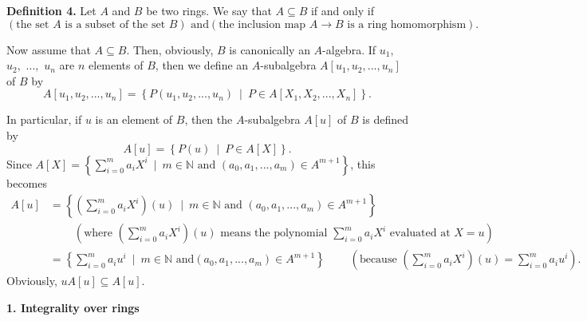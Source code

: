 \documentclass[12pt,final,notitlepage,onecolumn]{article}%
\begin{document}
\textbf{Definition 4.} Let $A$ and $B$ be two rings. We say that $A\subseteq
B$ if and only if
\[
\left(  \text{the set }A\text{ is a subset of the set }B\right)  \text{ and
}\left(  \text{the inclusion map }A\rightarrow B\text{ is a ring
homomorphism}\right)  .
\]


Now assume that $A\subseteq B$. Then, obviously, $B$ is canonically an
$A$-algebra. If $u_{1},$ $u_{2},$ $...,$ $u_{n}$ are $n$ elements of $B$, then
we define an $A$-subalgebra $A\left[  u_{1},u_{2},...,u_{n}\right]  $ of $B$
by%
\[
A\left[  u_{1},u_{2},...,u_{n}\right]  =\left\{  P\left(  u_{1},u_{2}%
,...,u_{n}\right)  \ \mid\ P\in A\left[  X_{1},X_{2},...,X_{n}\right]
\right\}  .
\]


In particular, if $u$ is an element of $B$, then the $A$-subalgebra $A\left[
u\right]  $ of $B$ is defined by%
\[
A\left[  u\right]  =\left\{  P\left(  u\right)  \ \mid\ P\in A\left[
X\right]  \right\}  .
\]
Since $A\left[  X\right]  =\left\{  \sum\limits_{i=0}^{m}a_{i}X^{i}%
\ \mid\ m\in\mathbb{N}\text{ and }\left(  a_{0},a_{1},...,a_{m}\right)  \in
A^{m+1}\right\}  $, this becomes
\begin{align*}
A\left[  u\right]   &  =\left\{  \left(  \sum\limits_{i=0}^{m}a_{i}%
X^{i}\right)  \left(  u\right)  \ \mid\ m\in\mathbb{N}\text{ and }\left(
a_{0},a_{1},...,a_{m}\right)  \in A^{m+1}\right\} \\
&  \ \ \ \ \ \ \ \ \ \ \left(  \text{where }\left(  \sum\limits_{i=0}^{m}%
a_{i}X^{i}\right)  \left(  u\right)  \text{ means the polynomial }%
\sum\limits_{i=0}^{m}a_{i}X^{i}\text{ evaluated at }X=u\right) \\
&  =\left\{  \sum\limits_{i=0}^{m}a_{i}u^{i}\ \mid\ m\in\mathbb{N}\text{ and
}\left(  a_{0},a_{1},...,a_{m}\right)  \in A^{m+1}\right\}
\ \ \ \ \ \ \ \ \ \ \left(  \text{because }\left(  \sum\limits_{i=0}^{m}%
a_{i}X^{i}\right)  \left(  u\right)  =\sum\limits_{i=0}^{m}a_{i}u^{i}\right)
.
\end{align*}
Obviously, $uA\left[  u\right]  \subseteq A\left[  u\right]  $.

\begin{center}
\color{blue} \textbf{1. Integrality over rings} \color{black}
\end{center}
\end{document}

